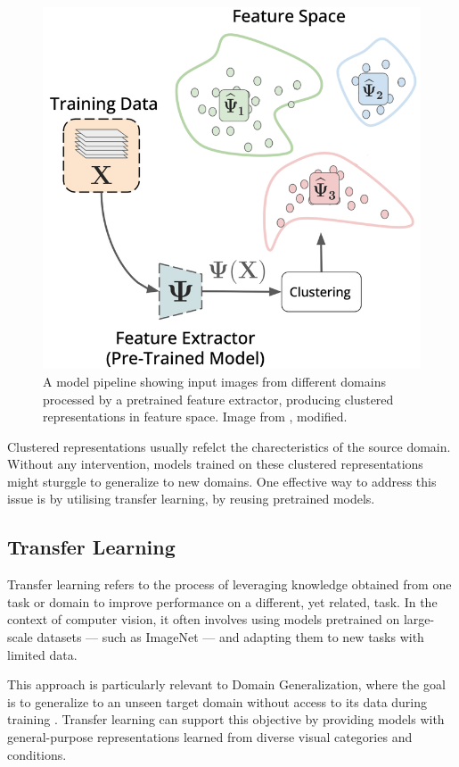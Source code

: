 \begin{figure}[!htb]
    \centering
    \includegraphics[height=0.25\textheight]{images/Pipeline-Feature_Space.png}
    \caption{A model pipeline showing input images from different domains processed by a pretrained feature extractor, producing clustered representations in feature space. Image from \cite{thomasWhatsLatentLeveraging2025}, modified.}
    \label{fig:Pipeline_Feature_Space}
\end{figure}
Clustered representations usually refelct the charecteristics of the source domain. Without any intervention, models trained on these clustered representations might sturggle to generalize to new domains.
One effective way to address this issue is by utilising transfer learning, by reusing pretrained models.
\subsection{Transfer Learning}
Transfer learning refers to the process of leveraging knowledge obtained from one task or domain to improve performance on a different, yet related, task. In the context of computer vision, it often involves using models pretrained on large-scale datasets — such as ImageNet — and adapting them to new tasks with limited data.

This approach is particularly relevant to Domain Generalization, where the goal is to generalize to an unseen target domain without access to its data during training \cite{gulrajaniSearchLostDomain2020,liDeeperBroaderArtier2017}. Transfer learning can support this objective by providing models with general-purpose representations learned from diverse visual categories and conditions.

